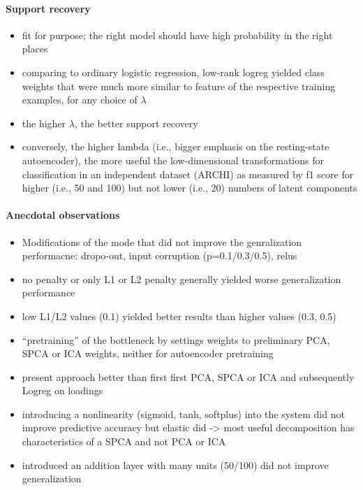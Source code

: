 \documentclass{article} %
\begin{document}
\paragraph{Support recovery}
\begin{itemize}
  \item{fit for purpose; the right model should have
  high probability in the right places}
  \item{comparing to ordinary logistic regression, low-rank logreg yielded class weights 
  that were much more similar to feature of the respective training examples,
  for any choice of $\lambda$}
  \item{the higher $\lambda$, the better support recovery}
  \item{conversely, the higher lambda (i.e., bigger emphasis on the
  resting-state autoencoder), the more useful the low-dimensional transformations
  for classification in an independent dataset (ARCHI) as measured by f1 score
  for higher (i.e., 50 and 100) but not lower (i.e., 20) numbers
  of latent components}
\end{itemize}

\paragraph{Anecdotal observations}
\begin{itemize}
  \item{Modifications of the mode that did not improve the genralization performacne:
  dropo-out, input corruption (p=0.1/0.3/0.5), relus}
  \item{no penalty or only L1 or L2 penalty generally yielded worse
  generalization performance}
  \item{low L1/L2 values (0.1) yielded better results
  than higher values (0.3, 0.5)}
  \item{``pretraining'' of the bottleneck by settings weights to
  preliminary PCA, SPCA or ICA weights, neither for autoencoder pretraining }
  \item{present approach better than first first PCA, SPCA or ICA and
  subsequently Logreg on loadings}
  \item{introducing a
  nonlinearity (sigmoid, tanh, softplus) into the system
  did not improve predictive accuracy but
  elastic did -> most useful decomposition has characteristics of a SPCA
  and not PCA or ICA}
  \item{introduced an addition layer with many units (50/100) did not
  improve generalization}
\end{itemize}
\end{document}
